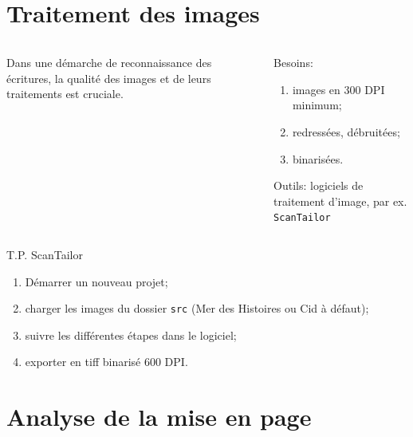\documentclass[10pt, compress,urlcolor=blue]{beamer}
\begin{document}


\section{Traitement des images}


\begin{frame}{}
    \begin{columns}
	\begin{column}{0.45\textwidth}
		Dans une démarche de reconnaissance des écritures, la qualité des images
		et de leurs traitements est cruciale.
	\end{column}
	\begin{column}{0.45\textwidth}
		Besoins:
		\begin{enumerate}
		    \item images en 300 DPI minimum;
		    \item redressées, débruitées;
		    \item binarisées.
		\end{enumerate}
		Outils: logiciels de traitement d'image, par ex. \texttt{ScanTailor}
	\end{column}
\end{columns}
    
\end{frame}

\begin{frame}{T.P. ScanTailor}
    
    \begin{enumerate}
        \item Démarrer un nouveau projet;
        \item charger les images du dossier \texttt{src} (Mer des Histoires ou Cid à défaut);
        \item suivre les différentes étapes dans le logiciel;
        \item exporter en tiff binarisé 600 DPI.
    \end{enumerate}
    
\end{frame}

\section{Analyse de la mise en page}
\end{document}
